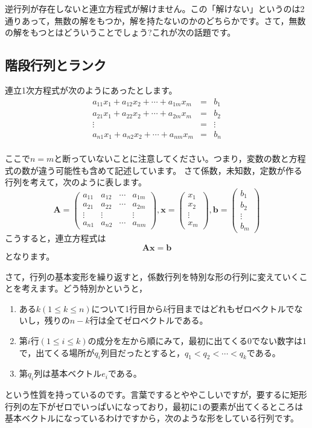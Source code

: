 \documentclass{ltjsbook}
\begin{document}
逆行列が存在しないと連立方程式が解けません。この「解けない」というのは2通りあって，無数の解をもつか，解を持たないのかのどちらかです。さて，無数の解をもつとはどういうことでしょう?これが次の話題です。

\subsection{階段行列とランク}
\label{StairAndRank}
連立1次方程式が次のようにあったとします。
\[
	\begin{array}{ccc}
		a_{11}x_1 + a_{12}x_2 + \cdots + a_{1m}x_m & = & b_1    \\
		a_{21}x_1 + a_{22}x_2 + \cdots + a_{2m}x_m & = & b_2    \\
		\vdots                                     & = & \vdots \\
		a_{n1}x_1 + a_{n2}x_2 + \cdots + a_{nm}x_m & = & b_n    \\
	\end{array}
\]

ここで$n=m$と断っていないことに注意してください。つまり，変数の数と方程式の数が違う可能性も含めて記述しています。
さて係数，未知数，定数が作る行列を考えて，次のように表します。
\[
	\bm{A} = \begin{pmatrix}
		a_{11} & a_{12} & \cdots & a_{1m} \\
		a_{21} & a_{22} & \cdots & a_{2m} \\
		\vdots & \vdots &        & \vdots \\
		a_{n1} & a_{n2} & \cdots & a_{nm}
	\end{pmatrix},
	\bm{x} = \begin{pmatrix} x_1 \\  x_2 \\ \vdots \\ x_m \end{pmatrix},
	\bm{b} = \begin{pmatrix} b_1 \\ b_2 \\ \vdots \\ b_m \end{pmatrix}
\]
こうすると，連立方程式は
\[ \bm{Ax} = \bm{b} \]
となります。

さて，行列の基本変形を繰り返すと，係数行列を特別な形の行列に変えていくことを考えます。どう特別かというと，
\begin{enumerate}
	\item ある$k(1 \le k \le n)$について1行目から$k$行目まではどれもゼロベクトルでないし，残りの$n-k$行は全てゼロベクトルである。
	\item 第$i$行$(1 \le i \le k)$の成分を左から順にみて，最初に出てくる0でない数字は1で，出てくる場所が$q_i$列目だったとすると，$q_1 < q_2 < \cdots < q_k$である。
	\item 第$q_i$列は基本ベクトル$e_i$である。
\end{enumerate}
という性質を持っているのです。言葉でするとややこしいですが，要するに矩形行列の左下がゼロでいっぱいになっており，最初に$1$の要素が出てくるところは基本ベクトルになっているわけですから，次のような形をしている行列です。
\end{document}
